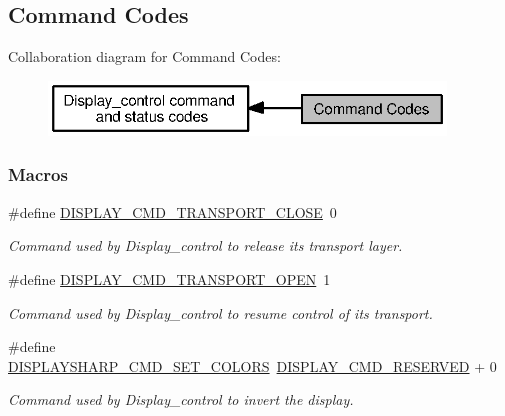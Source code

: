 \subsection{Command Codes}
\label{group___d_i_s_p_l_a_y___c_m_d}
Collaboration diagram for Command Codes\+:
\nopagebreak
\begin{figure}[H]
\begin{center}
\leavevmode
\includegraphics[width=299pt]{group___d_i_s_p_l_a_y___c_m_d}
\end{center}
\end{figure}
\subsubsection*{Macros}
\begin{DoxyCompactItemize}
\item 
\#define \hyperlink{group___d_i_s_p_l_a_y___c_m_d_ga5be24ea4a3ddfd94efbb513d649ac88b}{D\+I\+S\+P\+L\+A\+Y\+\_\+\+C\+M\+D\+\_\+\+T\+R\+A\+N\+S\+P\+O\+R\+T\+\_\+\+C\+L\+O\+S\+E}~0
\begin{DoxyCompactList}\small\item\em Command used by Display\+\_\+control to release its transport layer. \end{DoxyCompactList}\item 
\#define \hyperlink{group___d_i_s_p_l_a_y___c_m_d_gae12206be356c6b2ce885b5ada9b1854d}{D\+I\+S\+P\+L\+A\+Y\+\_\+\+C\+M\+D\+\_\+\+T\+R\+A\+N\+S\+P\+O\+R\+T\+\_\+\+O\+P\+E\+N}~1
\begin{DoxyCompactList}\small\item\em Command used by Display\+\_\+control to resume control of its transport. \end{DoxyCompactList}\item 
\#define \hyperlink{group___d_i_s_p_l_a_y___c_m_d_ga27b9623d9abc7aa7eeae74ea7d77cd0f}{D\+I\+S\+P\+L\+A\+Y\+S\+H\+A\+R\+P\+\_\+\+C\+M\+D\+\_\+\+S\+E\+T\+\_\+\+C\+O\+L\+O\+R\+S}~\hyperlink{group___d_i_s_p_l_a_y___c_o_n_t_r_o_l_ga99c2401cd11ea3b49e5e3e4ffac5c886}{D\+I\+S\+P\+L\+A\+Y\+\_\+\+C\+M\+D\+\_\+\+R\+E\+S\+E\+R\+V\+E\+D} + 0
\begin{DoxyCompactList}\small\item\em Command used by Display\+\_\+control to invert the display. \end{DoxyCompactList}\end{DoxyCompactItemize}


